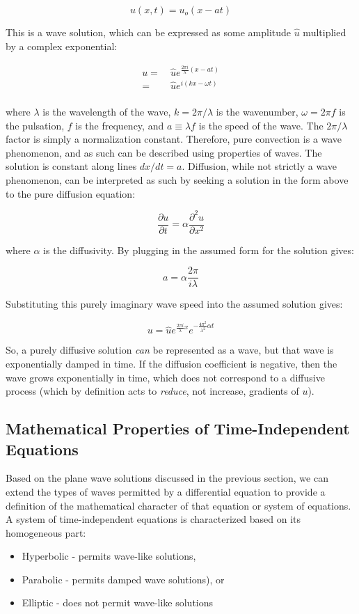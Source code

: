 \documentclass[10pt]{article}
\newcommand{\beq}{\begin{equation}}
\newcommand{\eeq}{\end{equation}}
\newcommand{\beqa}{\begin{equation}\begin{aligned}}
\newcommand{\eeqa}{\end{aligned}\end{equation}}
\begin{document}
\begin{flushleft}
\beq
u(x,t)=u_o(x-at)
\eeq

This is a wave solution, which can be expressed as some amplitude \(\hat{u}\) multiplied by a complex exponential:

\beqa
\label{eq:1DWave}
u=&\ \hat{u}e^{\frac{2\pi i}{\lambda}(x-at)}\\
=&\ \hat{u}e^{i(kx-\omega t)}\\
\eeqa

where \(\lambda\) is the wavelength of the wave, \(k=2\pi/\lambda\) is the wavenumber, \(\omega=2\pi f\) is the pulsation, \(f\) is the frequency, and \(a\equiv\lambda f\) is the speed of the wave. The \(2\pi/\lambda\) factor is simply a normalization constant. Therefore, pure convection is a wave phenomenon, and as such can be described using properties of waves. The solution is constant along lines \(dx/dt=a\). Diffusion, while not strictly a wave phenomenon, can be interpreted as such by seeking a solution in the form above to the pure diffusion equation:

\beq
\frac{\partial u}{\partial t}=\alpha \frac{\partial^2u}{\partial x^2}
\eeq

where \(\alpha\) is the diffusivity. By plugging in the assumed form for the solution gives:

\beq
a=\alpha\frac{2\pi}{i\lambda}
\eeq

Substituting this purely imaginary wave speed into the assumed solution gives:

\beq
u=\hat{u}e^{\frac{2\pi i}{\lambda}x}e^{-\frac{4\pi^2}{\lambda^2}\alpha t}
\eeq

So, a purely diffusive solution {\it can} be represented as a wave, but that wave is exponentially damped in time. If the diffusion coefficient is negative, then the wave grows exponentially in time, which does not correspond to a diffusive process (which by definition acts to {\it reduce}, not increase, gradients of \(u\)). 

\subsection{Mathematical Properties of Time-Independent Equations}
Based on the plane wave solutions discussed in the previous section, we can extend the types of waves permitted by a differential equation to provide a definition of the mathematical character of that equation or system of equations. A system of time-independent equations is characterized based on its homogeneous part:

\begin{itemize}
\item Hyperbolic - permits wave-like solutions,
\item Parabolic - permits damped wave solutions), or
\item Elliptic - does not permit wave-like solutions
\end{itemize}


\end{flushleft}
\end{document}
